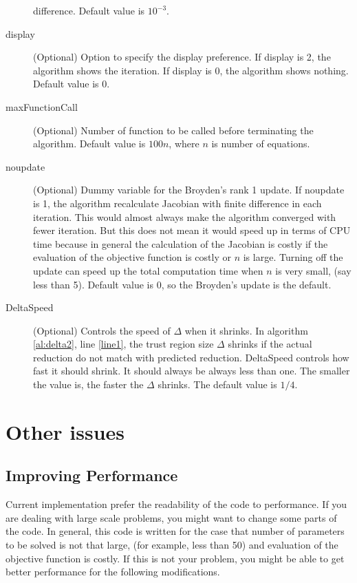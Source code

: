 \documentclass[12pt]{article}
\begin{document}
\begin{description}
      difference. Default value is $10^{-3}$. 
    \item[display] (Optional) Option to specify the display preference. If display is 2, the
      algorithm shows the iteration. If display is 0, the algorithm shows nothing. Default value
      is 0. 
    \item[maxFunctionCall] (Optional) Number of function to be called before
      terminating the algorithm. Default value is $100n$, where $n$ is number of equations. 
    \item[noupdate] (Optional) Dummy variable for the Broyden's rank 1 update. If noupdate is 1,
      the algorithm recalculate Jacobian with finite difference in each iteration. This would
      almost always make the algorithm converged with fewer iteration. But this does not mean it
      would speed up in terms of CPU time because in general the calculation of the Jacobian is
      costly if the evaluation of the objective function is costly or $n$ is large. Turning off
      the update can speed up the total computation time when $n$ is very small, (say less than
      5). Default value is 0, so the Broyden's update is the default.
    \item[DeltaSpeed] (Optional) Controls the speed of $\Delta$ when it shrinks. In algorithm
      \ref{al:delta2}, line \ref{line1}, the trust region size $\Delta$ shrinks if the actual
      reduction do not match with predicted reduction. DeltaSpeed controls how fast it should
      shrink. It should always be always less than one. The smaller the value is, the faster the
      $\Delta$ shrinks. The default value is $1/4$.
\end{description}



\section{Other issues}


\subsection{Improving Performance}
Current implementation prefer the readability of the code to performance. If you are dealing with
large scale problems, you might want to change some parts of the code. In general, this code is
written for the case that number of parameters to be solved is not that large, (for example, less
than 50) and evaluation of the objective function is costly. If this is not your problem, you
might be able to get better performance for the following modifications.
\end{document}
